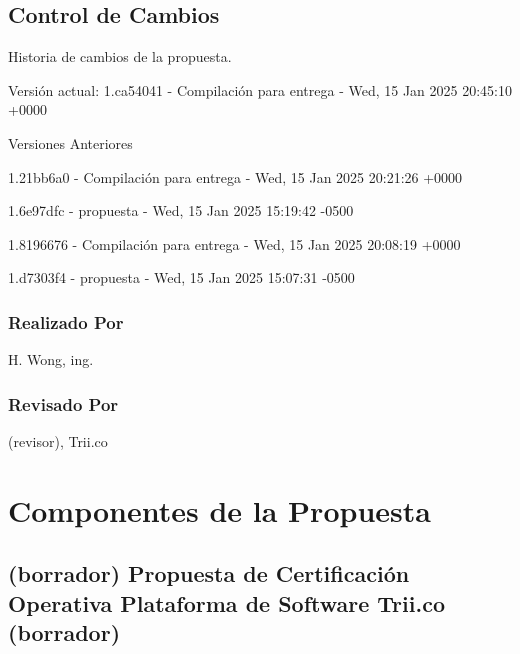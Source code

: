 \documentclass[
  paper=a4,
  ,captions=tableheading
]{scrartcl}
\renewenvironment{quote}{\begin{customblockquote}\list{}{\rightmargin=0em\leftmargin=0em}%
\item\relax\color{blockquote-text}\ignorespaces}{\unskip\unskip\endlist\end{customblockquote}}
\begin{document}
\subsection{Control de Cambios}\label{sec:control-de-cambios}

Historia de cambios de la propuesta.

Versión actual: 1.ca54041 - Compilación para entrega - Wed, 15 Jan 2025
20:45:10 +0000

Versiones Anteriores

1.21bb6a0 - Compilación para entrega - Wed, 15 Jan 2025 20:21:26 +0000

1.6e97dfc - propuesta - Wed, 15 Jan 2025 15:19:42 -0500

1.8196676 - Compilación para entrega - Wed, 15 Jan 2025 20:08:19 +0000

1.d7303f4 - propuesta - Wed, 15 Jan 2025 15:07:31 -0500

\subsubsection{Realizado Por}\label{sec:realizado-por}

H. Wong, ing.

\subsubsection{Revisado Por}\label{sec:revisado-por}

(revisor), Trii.co

\newpage

\section{Componentes de la
Propuesta}\label{sec:componentes-de-la-propuesta}

\subsection{(borrador) Propuesta de Certificación Operativa Plataforma
de Software Trii.co
(borrador)}\label{sec:borrador-propuesta-de-certificaciuxf3n-operativa-plataforma-de-software-trii.co-borrador}

\begin{quote}
\end{quote}
\end{document}
